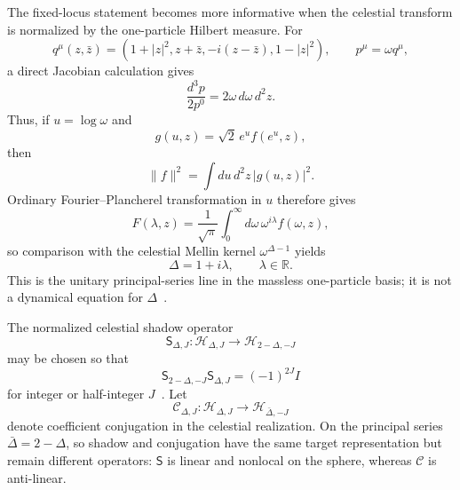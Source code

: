 \documentclass[11pt]{article}
\theoremstyle{definition}\newtheorem{definition}[theorem]{Definition}
\theoremstyle{remark}\newtheorem{remark}[theorem]{Remark}\newtheorem{conjecture}[theorem]{Conjecture}
\begin{document}
The fixed-locus statement becomes more informative when the celestial transform is normalized by the one-particle Hilbert measure. For
\begin{equation}
 q^\mu(z,\bar z)=(1+|z|^2,z+\bar z,-i(z-\bar z),1-|z|^2),
 \qquad p^\mu=\omega q^\mu,
\end{equation}
a direct Jacobian calculation gives
\begin{equation}\label{eq:masslessmeasure}
 \frac{d^3p}{2p^0}=2\omega\,d\omega\,d^2z.
\end{equation}
Thus, if $u=\log\omega$ and
\begin{equation}
 g(u,z)=\sqrt2\,e^u f(e^u,z),
\end{equation}
then
\begin{equation}
 \|f\|^2=\int du\,d^2z\,|g(u,z)|^2.
\end{equation}
Ordinary Fourier--Plancherel transformation in $u$ therefore gives
\begin{equation}
 F(\lambda,z)=\frac{1}{\sqrt\pi}\int_0^\infty
 d\omega\,\omega^{i\lambda}f(\omega,z),
\end{equation}
so comparison with the celestial Mellin kernel $\omega^{\Delta-1}$ yields
\begin{equation}\label{eq:principalplancherel}
 \boxed{\Delta=1+i\lambda,\qquad \lambda\in\mathbb R.}
\end{equation}
This is the unitary principal-series line in the massless one-particle basis; it is not a dynamical equation for $\Delta$~\cite{PasterskiShao2017,Pasterski2021}.

The normalized celestial shadow operator
\begin{equation}
 \mathsf S_{\Delta,J}:\mathcal H_{\Delta,J}\longrightarrow
 \mathcal H_{2-\Delta,-J}
\end{equation}
may be chosen so that
\begin{equation}\label{eq:shadowsquare}
 \mathsf S_{2-\Delta,-J}\mathsf S_{\Delta,J}
 =(-1)^{2J}I
\end{equation}
for integer or half-integer $J$~\cite{Pasterski2021}. Let
\begin{equation}
 \mathcal C_{\Delta,J}:\mathcal H_{\Delta,J}\longrightarrow
 \mathcal H_{\bar\Delta,-J}
\end{equation}
denote coefficient conjugation in the celestial realization. On the principal series $\bar\Delta=2-\Delta$, so shadow and conjugation have the same target representation but remain different operators: $\mathsf S$ is linear and nonlocal on the sphere, whereas $\mathcal C$ is anti-linear.
\end{document}
